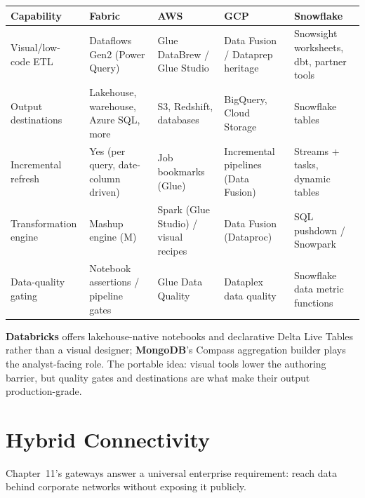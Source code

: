 \begin{center}
\footnotesize
\begin{tabular}{@{}p{2.8cm}p{3.2cm}p{3.2cm}p{3.2cm}p{3.2cm}@{}}
\toprule
\textbf{Capability} & \textbf{Fabric} & \textbf{AWS} & \textbf{GCP} & \textbf{Snowflake} \\
\midrule
Visual/low-code ETL & Dataflows Gen2 (Power Query) & Glue DataBrew / Glue Studio & Data Fusion / Dataprep heritage & Snowsight worksheets, dbt, partner tools \\
Output destinations & Lakehouse, warehouse, Azure SQL, more & S3, Redshift, databases & BigQuery, Cloud Storage & Snowflake tables \\
Incremental refresh & Yes (per query, date-column driven) & Job bookmarks (Glue) & Incremental pipelines (Data Fusion) & Streams + tasks, dynamic tables \\
Transformation engine & Mashup engine (M) & Spark (Glue Studio) / visual recipes & Data Fusion (Dataproc) & SQL pushdown / Snowpark \\
Data-quality gating & Notebook assertions / pipeline gates & Glue Data Quality & Dataplex data quality & Snowflake data metric functions \\
\bottomrule
\end{tabular}
\end{center}

\noindent \textbf{Databricks} offers lakehouse-native notebooks and declarative Delta Live
Tables rather than a visual designer; \textbf{MongoDB}'s Compass aggregation builder plays the
analyst-facing role. The portable idea: visual tools lower the authoring barrier, but quality
gates and destinations are what make their output production-grade.

\section{Hybrid Connectivity}
%
Chapter~11's gateways answer a universal enterprise requirement: reach data behind corporate
networks without exposing it publicly.

